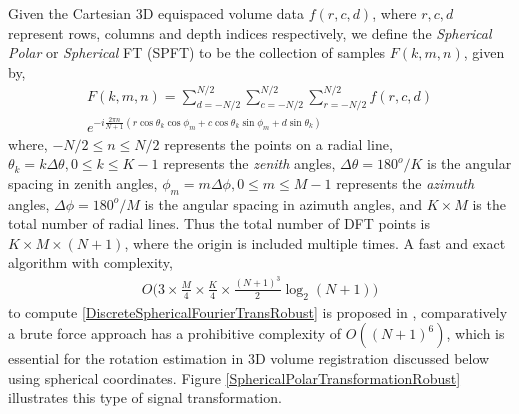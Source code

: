 \documentclass{UCF_ETD}
\begin{document}
Given the Cartesian $3$D equispaced volume data $f(r,c,d)$, where $r,c,d$ represent rows, columns and depth indices respectively, we define the \emph{Spherical Polar} or \emph{Spherical} FT (SPFT)  to be the collection of samples $F(k,m,n)$, given by, 
\begin{eqnarray}\label{DiscreteSphericalFourierTransRobust}
F( k, m, n) = \sum\limits_{d=-N/2}^{N/2} \sum\limits_{c=-N/2}^{N/2}\sum\limits_{r= -N/2}^{N/2} f(r,c,d) \nonumber \\
e^{-i\frac{2\pi n}{N+1}(r \cos \theta_k \cos\phi_m + c \cos\theta_k \sin \phi_m + d \sin \theta_k)}
\end{eqnarray}
where, $-N/2\leq n \leq N/2$ represents the points on a radial line,  $\theta_k = k\Delta \theta,0 \leq k \leq K-1$ represents the \emph{zenith} angles, $\Delta \theta = 180^o/K$ is the angular spacing in {zenith} angles, $\phi_m = m\Delta \phi,0 \leq m \leq M-1$ represents the \emph{azimuth} angles, $\Delta \phi = 180^o/M$ is the angular spacing in {azimuth} angles, and $K\times M$ is the total number of radial lines. Thus the total number of DFT points is $K \times M \times (N+1)$, where the origin is included multiple times. A fast and exact algorithm with complexity, 
\begin{eqnarray} \label{SphericalFourierTransformComplexity}
O\bigg(3\times \frac{M}{4}\times \frac{K}{4}\times\frac{(N+1)^3}{2}\log_2(N+1)\bigg)
\end{eqnarray}
 to compute \eqref{DiscreteSphericalFourierTransRobust} is proposed in \cite{Alam2015}, comparatively a brute force approach has a prohibitive complexity of $O((N+1)^6)$, which is essential for the rotation estimation in $3$D volume registration discussed below using spherical coordinates. Figure \ref{SphericalPolarTransformationRobust} illustrates this type of signal transformation.
\end{document}
